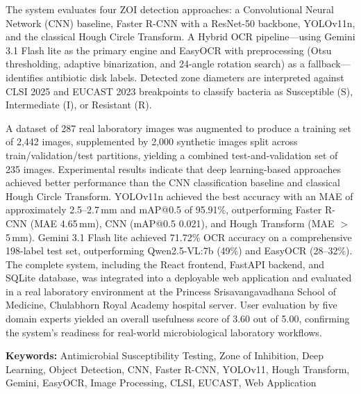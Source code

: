 The system evaluates four ZOI detection approaches: a Convolutional Neural Network (CNN) baseline,
Faster R-CNN with a ResNet-50 backbone, YOLOv11n, and the classical Hough Circle Transform.
A Hybrid OCR pipeline---using Gemini 3.1 Flash lite as the primary engine and EasyOCR with preprocessing
(Otsu thresholding, adaptive binarization, and 24-angle rotation search) as a fallback---identifies
antibiotic disk labels. Detected zone diameters are interpreted against CLSI 2025 and EUCAST 2023 breakpoints
to classify bacteria as Susceptible (S), Intermediate (I), or Resistant (R).

A dataset of 287 real laboratory images was augmented to produce a training set of 2,442 images,
supplemented by 2,000 synthetic images split across train/validation/test partitions,
yielding a combined test-and-validation set of 235 images.
Experimental results indicate that deep learning-based approaches achieved better performance than the CNN classification baseline and classical Hough Circle Transform.
YOLOv11n achieved the best accuracy with an MAE of approximately 2.5--2.7\,mm and mAP@0.5 of 95.91\%,
outperforming Faster R-CNN (MAE 4.65\,mm), CNN (mAP@0.5 0.021), and Hough Transform (MAE $>$ 5\,mm).
Gemini 3.1 Flash lite achieved 71.72\% OCR accuracy on a comprehensive 198-label test set, outperforming Qwen2.5-VL:7b (49\%) and EasyOCR (28--32\%).
The complete system, including the React frontend, FastAPI backend, and SQLite database, was integrated into a deployable web application and evaluated in a real laboratory environment at the Princess Srisavangavadhana School of Medicine, Chulabhorn Royal Academy hospital server.
User evaluation by five domain experts yielded an overall usefulness score of 3.60 out of 5.00,
confirming the system's readiness for real-world microbiological laboratory workflows.

\noindent\textbf{Keywords:} Antimicrobial Susceptibility Testing, Zone of Inhibition, Deep Learning, Object Detection,
CNN, Faster R-CNN, YOLOv11, Hough Transform, Gemini, EasyOCR, Image Processing, CLSI, EUCAST, Web Application

\newpage

\clearpage
{}
{}

